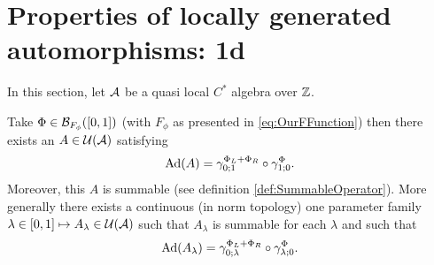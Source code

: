 \documentclass[12pt,a4paper,twoside]{article}
\numberwithin{equation}{section}
\begin{document}
\section{Properties of locally generated automorphisms: 1d}
In this section, let $\AA$ be a quasi local $C^*$ algebra over $\ZZ$.
\begin{lemma}\label{lem:PropertiesLocallyGeneratedAutomorphisms1d}
	Take $\Phi\in\BB_{F_\phi}([0,1])$ (with $F_\phi$ as presented in \eqref{eq:OurFFunction}) then there exists an $A\in\UU(\AA)$ satisfying
	\begin{equation}
		\Ad{A}=\gamma^{\Phi_L+\Phi_R}_{0;1}\circ\gamma^\Phi_{1;0}.
	\end{equation}
	Moreover, this $A$ is summable (see definition \ref{def:SummableOperator}). More generally there exists a continuous (in norm topology) one parameter family $\lambda\in[0,1]\mapsto A_\lambda\in\UU(\AA)$ such that $A_\lambda$ is summable for each $\lambda$ and such that
	\begin{equation}
		\Ad{A_\lambda}=\gamma^{\Phi_L+\Phi_R}_{0;\lambda}\circ\gamma^\Phi_{\lambda;0}.
	\end{equation}
\end{lemma}
\end{document}
